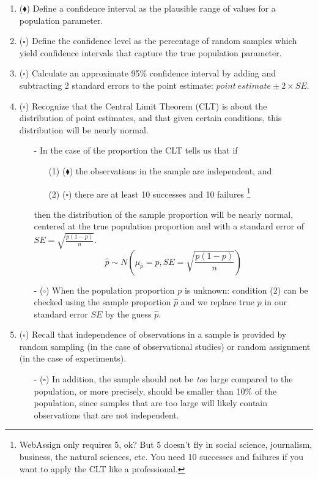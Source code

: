 \documentclass[11pt]{article}
\newcommand{\bs}{$\square$}
\newcommand{\bd}{$\blacklozenge$}
\begin{document}
\begin{enumerate}[resume]
\item (\bd) Define a confidence interval as the plausible range of values for a population parameter.

\item (\bs) Define the confidence level as the percentage of random samples which yield confidence intervals that capture the true population parameter.

\item (\bs) Calculate an approximate 95\% confidence interval by adding and subtracting 2 standard errors to the point estimate: $point~estimate \pm 2 \times SE$.

\item (\bs) Recognize that the Central Limit Theorem (CLT) is about the distribution of point estimates, and that given certain conditions, this distribution will be nearly normal.
\begin{itemize}
\item[-] In the case of the proportion the CLT tells us that if
\begin{itemize}[parsep=0pt]
\item[(1)] (\bd) the observations in the sample are independent, and
\item[(2)] (\bs) there are at least 10 successes and 10 failures%
    \footnote{%
    WebAssign only requires 5, ok? But 5 doesn't fly in social science, journalism, business, the natural sciences, etc. You need 10 successes and failures if you want to apply the CLT like a professional.
    }
\end{itemize}
then the distribution of the sample proportion will be nearly normal, centered at the true population proportion and with a standard error of $SE = \sqrt{\frac{p(1-p)}{n}}$.
\[ \hat{p} \sim N \left(\mu_{\hat{p}} = p, SE = \sqrt{\frac{p(1-p)}{n}} \right) \]
\item[-] (\bs) When the population proportion $p$ is unknown: condition (2) can be checked using the sample proportion $\hat{p}$ and we replace true $p$ in our standard error $SE$ by the guess $\hat{p}$.
\end{itemize}

\item (\bs) Recall that independence of observations in a sample is provided by random sampling (in the case of observational studies) or random assignment (in the case of experiments).
\begin{itemize}
\item[-] (\bs) In addition, the sample should not be \textit{too} large compared to the population, or more precisely, should be smaller than 10\% of the population, since samples that are too large will likely contain observations that are not independent.
\end{itemize}


\end{enumerate}
\end{document}
